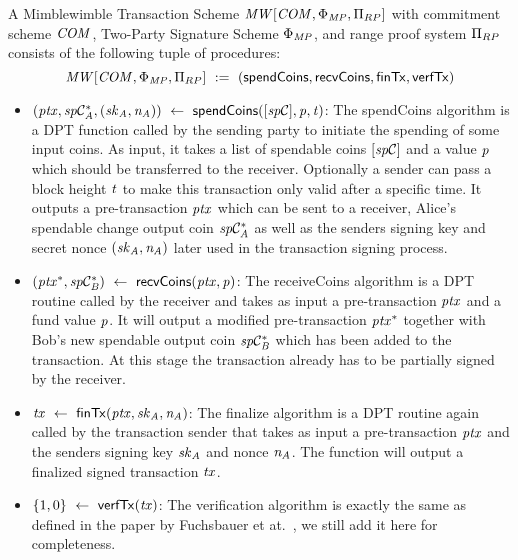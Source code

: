 \begin{definition}
    \label{def:atom:mw-tx-scheme}
    A Mimblewimble Transaction Scheme $\mathit{MW}[\mathit{COM},\Phi_{\mathit{MP}},\Pi_{RP}]$ with commitment scheme $\mathit{COM}$, Two-Party Signature Scheme $\Phi_{\mathit{MP}}$, and range proof system $\Pi_{RP}$ consists of the following tuple of procedures:
    \[ \mathit{MW}[\mathit{COM},\Phi_{\mathit{MP}},\Pi_{RP}] ~:=~ ( \mathsf{spendCoins},\mathsf{recvCoins},\mathsf{finTx},\mathsf{verfTx} ) \]
    \begin{itemize}
        \item $(\mathit{ptx}, \mathit{sp}\mathcal{C}_{\mathit{A}}^*, (\mathit{sk}_{\mathit{A}}, \mathit{\mathit{n}_{\mathit{A}}})) ~\leftarrow~ \mathsf{spendCoins}([\mathit{sp}\mathcal{C}],\mathit{p},\mathit{t})$: The spendCoins algorithm is a DPT function called by the sending party to initiate the spending of some input coins.
        As input, it takes a list of spendable coins $[\mathit{sp}\mathcal{C}]$ and a value $\mathit{p}$ which should be transferred to the receiver.
        Optionally a sender can pass a block height $\mathit{t}$ to make this transaction only valid after a specific time.
        It outputs a pre-transaction $\mathit{ptx}$ which can be sent to a receiver, Alice's spendable change output coin $\mathit{sp}\mathcal{C}_{\mathit{A}}^*$ as well as the senders signing key and secret nonce $(\mathit{sk}_{\mathit{A}}, \mathit{\mathit{n}_{\mathit{A}}})$ later used in the transaction signing process.
        \item $(\mathit{ptx}^*, \mathit{sp}\mathcal{C}_{\mathit{B}}^*) ~\leftarrow~ \mathsf{recvCoins}(\mathit{ptx},\mathit{p})$: The receiveCoins algorithm is a DPT routine called by the receiver and takes as input a pre-transaction $\mathit{ptx}$ and a fund value
        $\mathit{p}$.
        It will output a modified pre-transaction $\mathit{ptx}^*$ together with Bob's new spendable output coin $\mathit{sp}\mathcal{C}_{\mathit{B}}^*$ which has been added to the transaction.
        At this stage the transaction already has to be partially signed by the receiver.
        \item $\mathit{tx} ~\leftarrow~ \mathsf{finTx}(\mathit{ptx},\mathit{sk}_{\mathit{A}},\mathit{\mathit{n}_{\mathit{A}}})$: The finalize algorithm is a DPT routine again called by the transaction sender that takes as input a pre-transaction $\mathit{ptx}$ and the senders signing key $\mathit{sk}_{\mathit{A}}$ and nonce $\mathit{\mathit{n}_{\mathit{A}}}$.
        The function will output a finalized signed transaction $\mathit{tx}$.
        \item $\{1,0\} ~\leftarrow~ \mathsf{verfTx}(\mathit{tx})$: The verification algorithm is exactly the same as defined in the paper by Fuchsbauer et at.~\cite{fuchsbauer2019aggregate}, we still add it here for completeness.

\end{itemize}
\end{definition}
